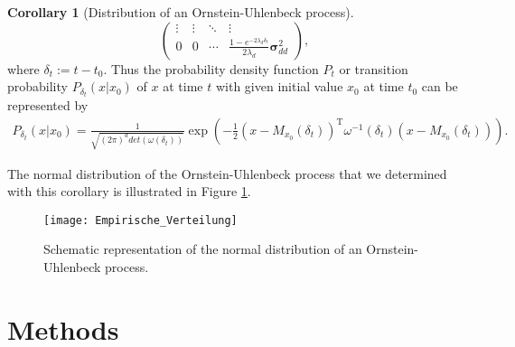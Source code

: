 \documentclass[11pt,titlepage]{article}
\theoremstyle{definition}
\newtheorem{corollary}[theorem]{Corollary}
\theoremstyle{remark}
\begin{document}
\begin{corollary}[Distribution of an Ornstein-Uhlenbeck process]
\[\begin{pmatrix}
			\vdots & \vdots & \ddots & \vdots \\
			0 & 0 & \cdots & \frac{1- e^{-2\lambda_d \delta_t}}{2\lambda_d} \boldsymbol{\sigma}_{dd}^2 
		\end{pmatrix},\]
		where $\delta_t := t-t_0$. 
		Thus the probability density function $P_t$ or transition probability $P_{\delta_t}(x\vert x_0)$ of $x$ at time $t$ with 
		given initial value $x_0$ at time $t_0$ can be represented by
		\begin{align*}
			P_{\delta_t}(x\vert x_0) = \frac{1}{\sqrt{(2\pi)^d det(\omega(\delta_t))}}\exp\left(-\frac{1}{2}(x- M_{x_0}(\delta_t))^{\text{T}}\omega^{-1}(\delta_t)(x-M_{x_0}(\delta_t))\right).
		\end{align*}
	\end{corollary}

	The normal distribution of the Ornstein-Uhlenbeck process that we determined with this corollary is illustrated in Figure \ref{Abb Empirische Verteilung1}.
	\begin{figure}[h!]
		\centering
		\texttt{[image: Empirische\_Verteilung]}
		\caption{Schematic representation of the normal distribution of an Ornstein-Uhlenbeck process.}
		\label{Abb Empirische Verteilung1}
	\end{figure}
	
	\clearpage
	
	\section{Methods} \label{sec methods}
	
\end{document}
